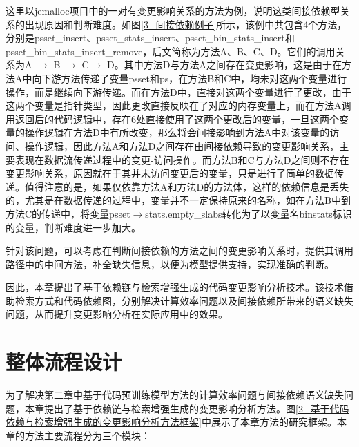 这里以jemalloc项目中的一对有变更影响关系的方法为例，说明这类间接依赖型关系的出现原因和判断难度。如图\ref{3_间接依赖例子}所示，该例中共包含4个方法，分别是psset\_insert、psset\_stats\_insert、psset\_bin\_stats\_insert和psset\_bin\_stats\_insert\_remove，后文简称为方法A、B、C、D。它们的调用关系为A $\rightarrow$ B $\rightarrow$ C$\rightarrow$ D。其中方法D与方法A之间存在变更影响，这是由于在方法A中向下游方法传递了变量psset和ps，在方法B和C中，均未对这两个变量进行操作，而是继续向下游传递。而在方法D中，直接对这两个变量进行了更改，由于这两个变量是指针类型，因此更改直接反映在了对应的内存变量上，而在方法A调用返回后的代码逻辑中，存在6处直接使用了这两个更改后的变量，一旦这两个变量的操作逻辑在方法D中有所改变，那么将会间接影响到方法A中对该变量的访问、操作逻辑，因此方法A和方法D之间存在由间接依赖导致的变更影响关系，主要表现在数据流传递过程中的变更-访问操作。而方法B和C与方法D之间则不存在变更影响关系，原因就在于其并未访问变更后的变量，只是进行了简单的数据传递。值得注意的是，如果仅依靠方法A和方法D的方法体，这样的依赖信息是丢失的，尤其是在数据传递的过程中，变量并不一定保持原来的名称，如在方法B中到方法C的传递中，将变量psset$\rightarrow$stats.empty\_slabs转化为了以变量名binstats标识的变量，判断难度进一步加大。




针对该问题，可以考虑在判断间接依赖的方法之间的变更影响关系时，提供其调用路径中的中间方法，补全缺失信息，以便为模型提供支持，实现准确的判断。

因此，本章提出了基于依赖链与检索增强生成的代码变更影响分析技术。该技术借助检索方式和代码依赖图，分别解决计算效率问题以及间接依赖所带来的语义缺失问题，从而提升变更影响分析在实际应用中的效果。

\section{整体流程设计}

为了解决第二章中基于代码预训练模型方法的计算效率问题与间接依赖语义缺失问题，本章提出了基于依赖链与检索增强生成的变更影响分析方法。图\ref{2_基于代码依赖与检索增强生成的变更影响分析方法框架}中展示了本章方法的研究框架。本章的方法主要流程分为三个模块：

